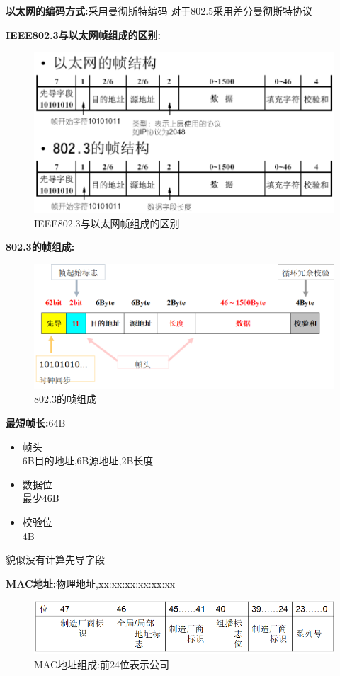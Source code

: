 \documentclass[UTF8,a4paper]{ctexart}
\newcommand{\spaceline}{\vspace{\baselineskip}}
\begin{document}
\spaceline
\textbf{以太网的编码方式:}采用曼彻斯特编码
对于802.5采用差分曼彻斯特协议

\spaceline
\textbf{IEEE802.3与以太网帧组成的区别:}
\begin{figure}[H]
  \centering
  \includegraphics[scale = 0.3]{assets/jisuanjiwangluo_f7e24.png}
  \caption{IEEE802.3与以太网帧组成的区别}
\end{figure}

\spaceline
\textbf{802.3的帧组成:}
\begin{figure}[H]
  \centering
  \includegraphics[scale = 0.4]{assets/jisuanjiwangluo_e1f57.png}
  \caption{802.3的帧组成}
\end{figure}

\textbf{最短帧长:}64B
\begin{itemize}
  \item 帧头\\
  6B目的地址,6B源地址,2B长度
  \item 数据位\\
  最少46B
  \item 校验位\\
  4B
\end{itemize}
{\color{blue}貌似没有计算先导字段}

\spaceline
\textbf{MAC地址:}物理地址,xx:xx:xx:xx:xx:xx
\begin{figure}[H]
  \centering
  \includegraphics[scale = 0.3]{assets/jisuanjiwangluo_1fa17.png}
  \caption{MAC地址组成:前24位表示公司}
\end{figure}
\end{document}
